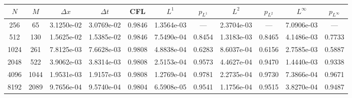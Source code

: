 \begin{tabular}{ccccccccccc}
\toprule
$N$ & $M$ & $\Delta x$ & $\Delta t$ & CFL & $L^1$ & $p_{L^1}$ & $L^2$ & $p_{L^2}$ & $L^\infty$ & $p_{L^\infty}$ \\
\midrule
256 & 65 & 3.1250e-02 & 3.0769e-02 & 0.9846 & 1.3564e-03 & --- & 2.3704e-03 & --- & 7.0906e-03 & --- \\
512 & 130 & 1.5625e-02 & 1.5385e-02 & 0.9846 & 7.5490e-04 & 0.8454 & 1.3183e-03 & 0.8465 & 4.1486e-03 & 0.7733 \\
1024 & 261 & 7.8125e-03 & 7.6628e-03 & 0.9808 & 4.8838e-04 & 0.6283 & 8.6037e-04 & 0.6156 & 2.7585e-03 & 0.5887 \\
2048 & 522 & 3.9062e-03 & 3.8314e-03 & 0.9808 & 2.5153e-04 & 0.9573 & 4.4627e-04 & 0.9470 & 1.4440e-03 & 0.9338 \\
4096 & 1044 & 1.9531e-03 & 1.9157e-03 & 0.9808 & 1.2769e-04 & 0.9781 & 2.2735e-04 & 0.9730 & 7.3866e-04 & 0.9671 \\
8192 & 2089 & 9.7656e-04 & 9.5740e-04 & 0.9804 & 6.5908e-05 & 0.9541 & 1.1756e-04 & 0.9515 & 3.8270e-04 & 0.9487 \\
\bottomrule
\end{tabular}